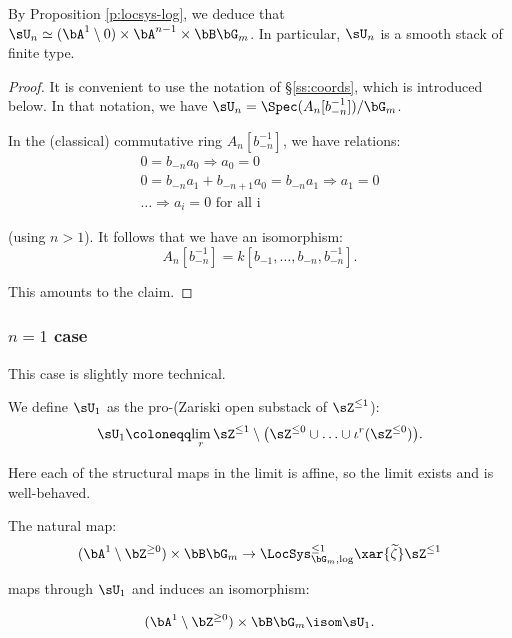 \begin{rem}
\notready

By Proposition \ref{p:locsys-log}, we deduce that $\sU_n \simeq
(\bA^1 \setminus 0 ) \times \bA^{n-1} \times \bB \bG_m$. In particular,
$\sU_n$ is a smooth stack of finite type.

\end{rem}

\begin{proof}

It is convenient to use the notation of \S \ref{ss:coords}, which is introduced
below.
In that notation, we have $\sU_n = \Spec(A_n[b_{-n}^{-1}])/\bG_m$.

In the (classical) commutative ring $A_n[b_{-n}^{-1}]$, we have relations:
%
\[
\begin{gathered}
0 = b_{-n} a_0 \Rightarrow a_0 = 0 \\
0 = b_{-n} a_1 + b_{-n+1} a_0 = b_{-n} a_1 \Rightarrow a_1 = 0 \\
\ldots \Rightarrow a_i = 0 \text{ for all i}
\end{gathered}
\]

 (using $n>1$).
It follows that we have an isomorphism:
%
\[
A_n[b_{-n}^{-1}] = k[b_{-1},\ldots,b_{-n},b_{-n}^{-1}].
\]

 This amounts to the claim.

\end{proof}

\subsubsection{$n = 1$ case}

This case is slightly more technical.

We define $\sU_1$ as the pro-(Zariski open substack of $\sZ^{\leq 1}$):
%
\[
\sU_1 \coloneqq \underset{r}{\lim} \, {\sZ^{\leq 1} \setminus
\big(\sZ^{\leq 0} \cup \ldots \cup \iota^r(\sZ^{\leq 0})\big)}.
\]

 Here each of the structural maps in the limit is affine,
so the limit exists and is well-behaved.

\begin{lem}
\notready\label{l:u1}

The natural map:
%
\[
(\bA^1 \setminus \bZ^{\geq 0}) \times \bB \bG_m \to
\LocSys_{\bG_m,\log}^{\leq 1} \xar{\widetilde{\zeta}}
\sZ^{\leq 1}
\]

 maps through $\sU_1$ and induces an isomorphism:

\[
(\bA^1 \setminus \bZ^{\geq 0}) \times \bB \bG_m \isom \sU_1.
\]

\end{lem}

